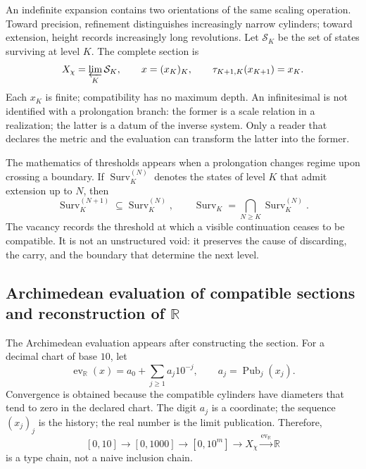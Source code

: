 An indefinite expansion contains two orientations of the same scaling
operation. Toward precision, refinement distinguishes increasingly narrow
cylinders; toward extension, height records increasingly long revolutions.
Let \(\mathcal S_K\) be the set of states surviving at level
\(K\). The complete section is
\begin{equation}\label{p12-83-c0-s2:eq:amp-seccion-infinita}
 X_\chi=\varprojlim_K\mathcal S_K,
 \qquad
 x=(x_K)_K,
 \qquad \tau_{K+1,K}(x_{K+1})=x_K.
\end{equation}
Each \(x_K\) is finite; compatibility has no maximum depth.
An infinitesimal is not identified with a prolongation branch: the former
is a scale relation in a realization; the latter is a datum of the
inverse system. Only a reader that declares the metric and the evaluation can
transform the latter into the former.

The mathematics of thresholds appears when a prolongation changes regime
upon crossing a boundary. If
\(\operatorname{Surv}_K^{(N)}\) denotes the states of level \(K\) that admit
extension up to \(N\), then
\begin{equation}\label{p12-83-c0-s2:eq:amp-horizontes-supervivencia}
 \operatorname{Surv}_K^{(N+1)}\subseteq
 \operatorname{Surv}_K^{(N)},
 \qquad
 \operatorname{Surv}_K=\bigcap_{N\geq K}
 \operatorname{Surv}_K^{(N)}.
\end{equation}
The vacancy records the threshold at which a visible continuation ceases to
be compatible. It is not an unstructured void: it preserves the cause of
discarding, the carry, and the boundary that determine the next level.

\subsection{Archimedean evaluation of compatible sections and reconstruction of \(\mathbb R\)}

The Archimedean evaluation appears after constructing the section. For
a decimal chart of base \(10\), let
\begin{equation}\label{p12-83-c0-s2:eq:amp-evaluacion-arquimediana}
 \operatorname{ev}_{\mathbb R}(x)
 =a_0+\sum_{j\geq1}a_j10^{-j},
 \qquad a_j=\operatorname{Pub}_j(x_j).
\end{equation}
Convergence is obtained because the compatible cylinders have diameters
that tend to zero in the declared chart. The digit \(a_j\) is a coordinate;
the sequence \((x_j)_j\) is the history; the real number is the limit publication.
Therefore,
\begin{equation}\label{p12-83-c0-s2:eq:amp-cadena-recta-R}
 [0,10]\longrightarrow[0,1000]
 \longrightarrow[0,10^m]
 \longrightarrow X_\chi
 \xrightarrow{\operatorname{ev}_{\mathbb R}}\mathbb R
\end{equation}
is a type chain, not a naive inclusion chain.

